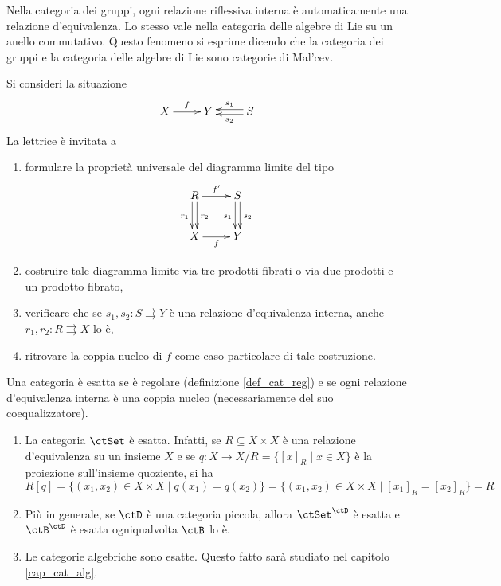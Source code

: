 \begin{exercise}\label{exer_maltsev}
 Nella categoria dei gruppi, ogni relazione riflessiva interna è automaticamente una relazione d'equivalenza.
 Lo stesso vale nella categoria delle algebre di Lie su un anello commutativo. Questo fenomeno si esprime dicendo
 che la categoria dei gruppi e la categoria delle algebre di Lie sono categorie di Mal'cev.
\end{exercise}

\begin{exercise}\label{exer_coppianucleo_gen}
 Si consideri la situazione
 \[\xymatrix{X \ar[r]^-{f} & Y & S \ar@<-0.5ex>[l]_-{s_1} \ar@<0.5ex>[l]^-{s_2}}\]
 La lettrice è invitata a
 \begin{enumerate}
  \item formulare la proprietà universale del diagramma limite del tipo
        \[\xymatrix{R \ar@<-0.5ex>[d]_{r_1} \ar@<0.5ex>[d]^{r_2} \ar[r]^-{f'} & S \ar@<-0.5ex>[d]_{s_1} \ar@<0.5ex>[d]^{s_2} \\
         X \ar[r]_-{f} & Y}\]
  \item costruire tale diagramma limite via tre prodotti fibrati o via due prodotti e un prodotto fibrato,
  \item verificare che se \(s_1,s_2 \colon S \rightrightarrows Y\) è una relazione d'equivalenza interna, anche
        \(r_1,r_2 \colon R \rightrightarrows X\) lo è,
  \item ritrovare la coppia nucleo di \(f\) come caso particolare di tale costruzione.
 \end{enumerate}
\end{exercise}

\begin{definition}\label{def_cat_esatta}
 Una categoria è esatta se è regolare (definizione \ref{def_cat_reg}) e se ogni relazione d'equivalenza interna
 è una coppia nucleo (necessariamente del suo coequalizzatore).
\end{definition}

\begin{examples}\label{ex_cat_esatte}
 \hfill
 \begin{enumerate}
  \item La categoria \(\ctSet\) è esatta. Infatti, se \(R \subseteq X \times X\) è una relazione d'equivalenza su un
        insieme \(X\) e se \(q \colon X \to X/R = \{[x]_R \mid x \in X \}\) è la proiezione sull'insieme quoziente, si ha
        \[R[q] = \{(x_1,x_2) \in X \times X \mid q(x_1) = q(x_2)\} = \{(x_1,x_2) \in X \times X \mid [x_1]_R = [x_2]_R\} = R\]
  \item Più in generale, se \(\ctD\) è una categoria piccola, allora \(\ctSet^{\ctD}\) è esatta e \(\ctB^{\ctD}\) è
        esatta ogniqualvolta \(\ctB\) lo è.
  \item Le categorie algebriche sono esatte. Questo fatto sarà studiato nel capitolo \ref{cap_cat_alg}.
 \end{enumerate}
\end{examples}

